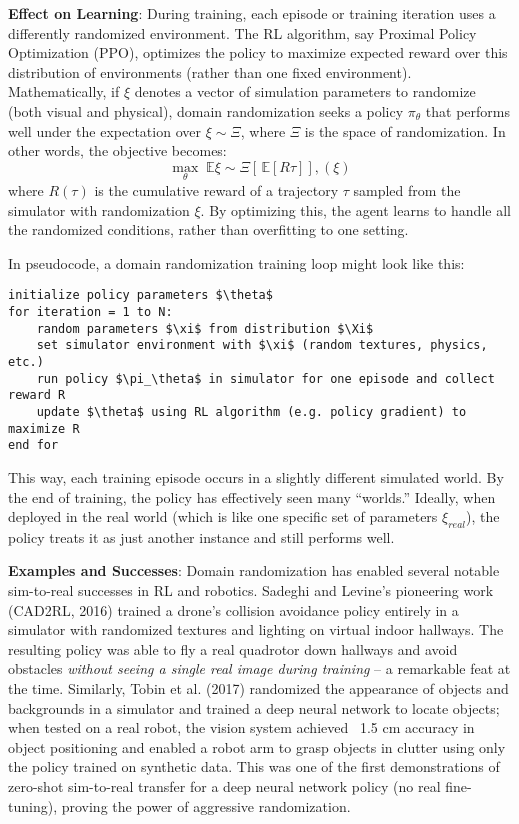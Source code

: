 \textbf{Effect on Learning}: During training, each episode or training iteration uses a differently randomized environment. The RL algorithm, say Proximal Policy Optimization (PPO), optimizes the policy to maximize expected reward over this distribution of environments (rather than one fixed environment). Mathematically, if $\xi$ denotes a vector of simulation parameters to randomize (both visual and physical), domain randomization seeks a policy $\pi_\theta$ that performs well under the expectation over $\xi \sim \Xi$, where $\Xi$ is the space of randomization. In other words, the objective
becomes:
$$\max_\theta \; \mathbb{E}{\xi \sim \Xi}\left[\, \mathbb{E}[R\tau]\right],(\xi)$$
where $R(\tau)$ is the cumulative reward of a trajectory $\tau$ sampled from the simulator with randomization $\xi$. By optimizing this, the agent learns to handle all the randomized conditions, rather than overfitting to one setting.

In pseudocode, a domain randomization training loop might look like this:

\begin{lstlisting}[mathescape=true]
initialize policy parameters $\theta$
for iteration = 1 to N:
    random parameters $\xi$ from distribution $\Xi$
    set simulator environment with $\xi$ (random textures, physics, etc.)
    run policy $\pi_\theta$ in simulator for one episode and collect reward R
    update $\theta$ using RL algorithm (e.g. policy gradient) to maximize R
end for
\end{lstlisting}
This way, each training episode occurs in a slightly different simulated world. By the end of training, the policy has effectively seen many “worlds.” Ideally, when deployed in the real world (which is like one specific set of parameters $\xi_{real}$), the policy treats it as just another instance and still performs well.

\textbf{Examples and Successes}: Domain randomization has enabled several notable sim-to-real successes in RL and robotics. Sadeghi and Levine’s pioneering work (CAD2RL, 2016) trained a drone’s collision avoidance policy entirely in a simulator with randomized textures and lighting on virtual indoor hallways. The resulting policy was able to fly a real quadrotor down hallways and avoid obstacles \textit{without seeing a single real image during training} – a remarkable feat at the time. Similarly, Tobin et al. (2017) randomized the appearance of objects and backgrounds in a simulator and trained a deep neural network to locate objects; when tested on a real robot, the vision system achieved ~1.5 cm accuracy in object positioning and enabled a robot arm to grasp objects in clutter using only the policy trained on synthetic data. This was one of the first demonstrations of zero-shot sim-to-real transfer for a deep neural network policy (no real fine-tuning), proving the power of aggressive randomization.

